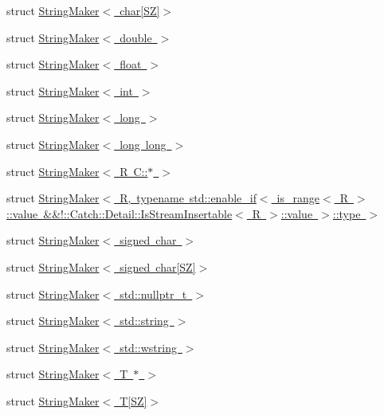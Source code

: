 \begin{DoxyCompactItemize}
struct \mbox{\hyperlink{struct_catch_1_1_string_maker_3_01char[_s_z]_4}{String\+Maker$<$ char\mbox{[}\+S\+Z\mbox{]}$>$}}
\item 
struct \mbox{\hyperlink{struct_catch_1_1_string_maker_3_01double_01_4}{String\+Maker$<$ double $>$}}
\item 
struct \mbox{\hyperlink{struct_catch_1_1_string_maker_3_01float_01_4}{String\+Maker$<$ float $>$}}
\item 
struct \mbox{\hyperlink{struct_catch_1_1_string_maker_3_01int_01_4}{String\+Maker$<$ int $>$}}
\item 
struct \mbox{\hyperlink{struct_catch_1_1_string_maker_3_01long_01_4}{String\+Maker$<$ long $>$}}
\item 
struct \mbox{\hyperlink{struct_catch_1_1_string_maker_3_01long_01long_01_4}{String\+Maker$<$ long long $>$}}
\item 
struct \mbox{\hyperlink{struct_catch_1_1_string_maker_3_01_r_01_c_1_1_5_01_4}{String\+Maker$<$ R C\+::$\ast$ $>$}}
\item 
struct \mbox{\hyperlink{struct_catch_1_1_string_maker_3_01_r_00_01typename_01std_1_1enable__if_3_01is__range_3_01_r_01_4536d8fedfff6d62432b3dc59b56e1380}{String\+Maker$<$ R, typename std\+::enable\+\_\+if$<$ is\+\_\+range$<$ R $>$\+::value \&\&!\+::\+Catch\+::\+Detail\+::\+Is\+Stream\+Insertable$<$ R $>$\+::value $>$\+::type $>$}}
\item 
struct \mbox{\hyperlink{struct_catch_1_1_string_maker_3_01signed_01char_01_4}{String\+Maker$<$ signed char $>$}}
\item 
struct \mbox{\hyperlink{struct_catch_1_1_string_maker_3_01signed_01char[_s_z]_4}{String\+Maker$<$ signed char\mbox{[}\+S\+Z\mbox{]}$>$}}
\item 
struct \mbox{\hyperlink{struct_catch_1_1_string_maker_3_01std_1_1nullptr__t_01_4}{String\+Maker$<$ std\+::nullptr\+\_\+t $>$}}
\item 
struct \mbox{\hyperlink{struct_catch_1_1_string_maker_3_01std_1_1string_01_4}{String\+Maker$<$ std\+::string $>$}}
\item 
struct \mbox{\hyperlink{struct_catch_1_1_string_maker_3_01std_1_1wstring_01_4}{String\+Maker$<$ std\+::wstring $>$}}
\item 
struct \mbox{\hyperlink{struct_catch_1_1_string_maker_3_01_t_01_5_01_4}{String\+Maker$<$ T $\ast$ $>$}}
\item 
struct \mbox{\hyperlink{struct_catch_1_1_string_maker_3_01_t[_s_z]_4}{String\+Maker$<$ T\mbox{[}\+S\+Z\mbox{]}$>$}}
\item 

\end{DoxyCompactItemize}
